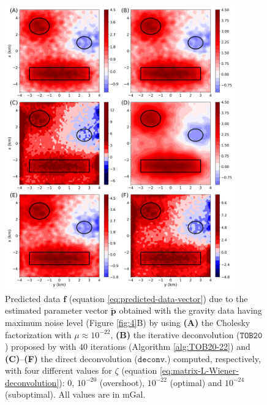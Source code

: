 \begin{figure}[htbp]
	\begin{center}
		\includegraphics[width=10cm]{Fig/stability_grav_comparison}
	\end{center}
	\caption{
		Predicted data $\mathbf{f}$ (equation \ref{eq:predicted-data-vector}) due to the estimated parameter vector
		$\tilde{\mathbf{p}}$ obtained with the gravity data having maximum noise level (Figure \ref{fig:4}B) by using
		\textbf{(A)} the Cholesky factorization with $\mu \approx 10^{-22}$, 
		\textbf{(B)} the iterative deconvolution ($\mathtt{TOB20}$) proposed by \citet{takahashi-etal2020} with $40$ 
		iterations (Algorithm \ref{alg:TOB20-22}) and
		\textbf{(C)}--\textbf{(F)} the direct deconvolution ($\mathtt{deconv.}$) computed, respectively, with four different 
		values for $\zeta$ (equation \ref{eq:matrix-L-Wiener-deconvolution}): $0$, $10^{-20}$ (overshoot), $10^{-22}$ (optimal)
		and $10^{-24}$ (suboptimal).
		All values are in $\mathrm{mGal}$.
		}
	\label{fig:5}
\end{figure}

